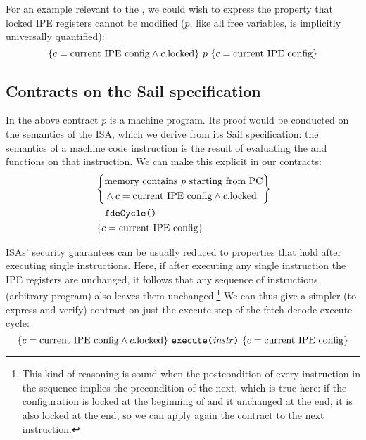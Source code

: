 For an example relevant to the \msp, we could wish to express the property that locked IPE registers cannot be modified (\(p\), like all free variables, is implicitly universally quantified):
\[ \hoare
  {c = \text{current IPE config} \wedge c.\mathrm{locked}}
  {p}
  {c = \text{current IPE config}} \]

\subsection{Contracts on the Sail specification}

In the above contract \(p\) is a \msp machine program. Its proof would be conducted on the semantics of the \msp ISA, which we derive from its Sail specification: the semantics of a machine code instruction is the result of evaluating the  and  functions on that instruction. We can make this explicit in our contracts:
\[ \hoarem
  {\begin{aligned}
    &\text{memory contains \(p\) starting from PC} \\
    &{}\wedge c = \text{current IPE config} \wedge c.\mathrm{locked}
  \end{aligned}}
  {\texttt{fdeCycle()}}
  {c = \text{current IPE config}} \]

ISAs' security guarantees can be usually reduced to properties that hold after executing single instructions. Here, if after executing any single instruction the IPE registers are unchanged, it follows that any sequence of instructions (\ie arbitrary program) also leaves them unchanged.\footnote{This kind of reasoning is sound when the postcondition of every instruction in the sequence implies the precondition of the next, which is true here: if the configuration is locked at the beginning of  and it unchanged at the end, it is also locked at the end, so we can apply again the contract to the next instruction.} We can thus give a simpler (to express and verify) contract on just the execute step of the fetch-decode-execute cycle:
\[ \hoare
  {c = \text{current IPE config} \wedge c.\mathrm{locked}}
  {\texttt{execute(\(\mathit{instr}\))}}
  {c = \text{current IPE config}} \]




